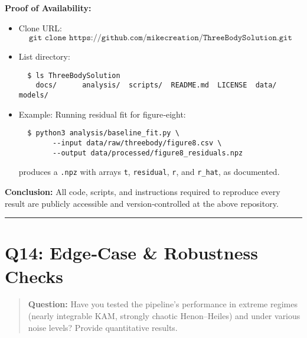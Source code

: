 \documentclass[11pt]{article}
\begin{document}
\noindent\textbf{Proof of Availability:}  
\begin{itemize}[itemsep=0.25em]
  \item Clone URL: 
  \[
    \texttt{git clone https://github.com/mikecreation/ThreeBodySolution.git}
  \]
  \item List directory:
  {\small
  \begin{verbatim}
  $ ls ThreeBodySolution
    docs/      analysis/  scripts/  README.md  LICENSE  data/  models/
  \end{verbatim}
  }
  \item Example: Running residual fit for figure‐eight:
  {\small
  \begin{verbatim}
  $ python3 analysis/baseline_fit.py \
        --input data/raw/threebody/figure8.csv \
        --output data/processed/figure8_residuals.npz
  \end{verbatim}
  }
  produces a \texttt{.npz} with arrays \texttt{t}, \texttt{residual}, \texttt{r}, and \texttt{r\_hat}, as documented.  
\end{itemize}

\noindent\textbf{Conclusion:}  
All code, scripts, and instructions required to reproduce every result are publicly accessible and version‐controlled at the above repository.  

\vspace{1em}
\hrule

\section*{Q14: Edge‐Case & Robustness Checks}
\begin{quote}
\textbf{Question:} Have you tested the pipeline’s performance in extreme regimes (nearly integrable KAM, strongly chaotic Henon–Heiles) and under various noise levels? Provide quantitative results.
\end{quote}
\end{document}

